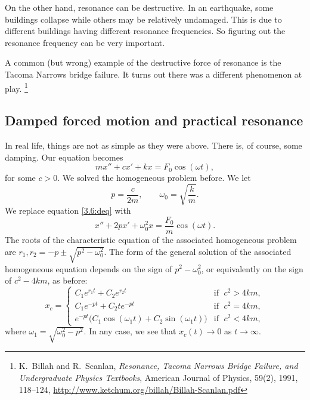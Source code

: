 On the other hand, resonance can be destructive.
In an earthquake, some buildings collapse while
others may be relatively undamaged.  This is due to different buildings
having different resonance frequencies.  So figuring out the resonance
frequency can be very important.

A common (but wrong) example of the destructive force of resonance is the Tacoma
Narrows bridge failure.  It turns out there was a different
phenomenon at play.%
\footnote{K.\ Billah and R.\ Scanlan, \emph{Resonance, Tacoma Narrows
Bridge Failure, and Undergraduate Physics Textbooks}, American Journal of
Physics, 59(2), 1991, 118--124,
\url{http://www.ketchum.org/billah/Billah-Scanlan.pdf}}

\subsection{Damped forced motion and practical resonance}

In real life, things are not as simple as they were above.  There is,
of course, some damping.  Our equation becomes
\begin{equation} \label{3.6:deq}
mx'' + cx' + kx = F_0 \cos (\omega t) ,
\end{equation}
for some $c > 0$.  We solved the homogeneous problem before.  We let
\begin{equation*}
p = \frac{c}{2m},  \qquad \omega_0 = \sqrt{\frac{k}{m}} .
\end{equation*}
We replace equation \eqref{3.6:deq} with
\begin{equation*}
x'' + 2px' + \omega_0^2x = \frac{F_0}{m} \cos (\omega t) .
\end{equation*}
The roots of the characteristic equation of the associated
homogeneous problem are $r_1,r_2 = -p \pm \sqrt{p^2 - \omega_0^2}$.  The form
of the general solution of the associated homogeneous equation
depends on the sign of $p^2 - \omega_0^2$, or
equivalently on the sign of $c^2 - 4km$, as before:
\begin{equation*}
x_c =
\begin{cases}
C_1 e^{r_1 t} + C_2 e^{r_2 t} & \text{if } \; c^2 > 4km , \\
C_1 e^{-p t} + C_2 t e^{-p t} & \text{if } \; c^2 = 4km , \\
e^{-p t} \bigl( C_1 \cos (\omega_1 t) + C_2 \sin (\omega_1 t) \bigr) &
  \text{if } \; c^2 < 4km ,
\end{cases}
\end{equation*}
where $\omega_1 = \sqrt{\omega_0^2 - p^2}$.  In any case, we see that
$x_c(t) \to 0$ as $t \to \infty$.

